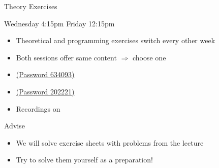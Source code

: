 \begin{frame}[t]{Theory Exercises}

    Wednesday 4:15pm  Friday 12:15pm

    \vspace{0.3cm}
    \begin{itemize}
        \setlength\itemsep{0.3cm}
        \item Theoretical and programming exercises switch every other week
        \item Both sessions offer same content $\Rightarrow$ choose one
        \item \href{https://fau.zoom.us/j/95317133405?pwd=c3dpSUc1WkNHU3haZHg5NERyNXAxUT09}{ (Password 634093)}
        \item \href{https://fau.zoom.us/j/92488417095?pwd=UzJIdE55eHpGdlBRU2pqZk51eGIydz09}{ (Password 202221)}
        \item Recordings on \href{https://www.video.uni-erlangen.de/course/id/1578}{}
    \end{itemize}

    \vspace{0.3cm}
    \begin{block}{Advise}
        \begin{itemize}
            \setlength\itemsep{0.3cm}
            \item We will solve exercise sheets with problems from the lecture
            \item Try to solve them yourself as a preparation!
        \end{itemize}
    \end{block}
\end{frame}

